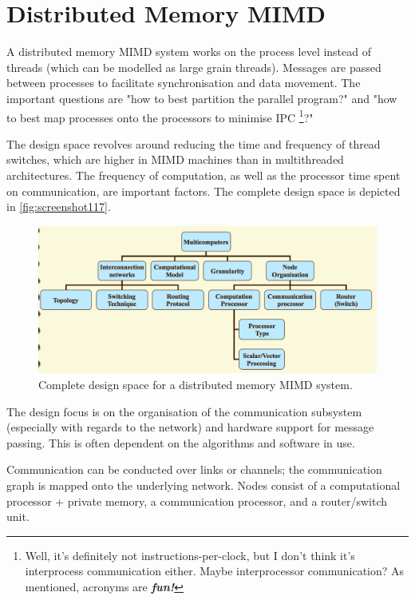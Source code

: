 \chapter{Distributed Memory MIMD}
A distributed memory MIMD system works on the process level instead of threads (which can be modelled as large grain threads). Messages are passed between processes to facilitate synchronisation and data movement. The important questions are "how to best partition the parallel program?" and "how to best map processes onto the processors to minimise IPC \footnote{Well, it's definitely not instructions-per-clock, but I don't think it's interprocess communication either. Maybe interprocessor communication? As mentioned, acronyms are \textbf{\textit{fun!}}}?"

The design space revolves around reducing the time and frequency of thread switches, which are higher in MIMD machines than in multithreaded architectures. The frequency of computation, as well as the processor time spent on communication, are important factors. The complete design space is depicted in \autoref{fig:screenshot117}.

\begin{figure}
\centering
\includegraphics[width=0.7\linewidth]{figures/screenshot117}
\caption{Complete design space for a distributed memory MIMD system.}
\label{fig:screenshot117}
\end{figure}

The design focus is on the organisation of the communication subsystem (especially with regards to the network) and hardware support for message passing. This is often dependent on the algorithms and software in use.

Communication can be conducted over links or channels; the communication graph is mapped onto the underlying network. Nodes consist of a computational processor + private memory, a communication processor, and a router/switch unit.

